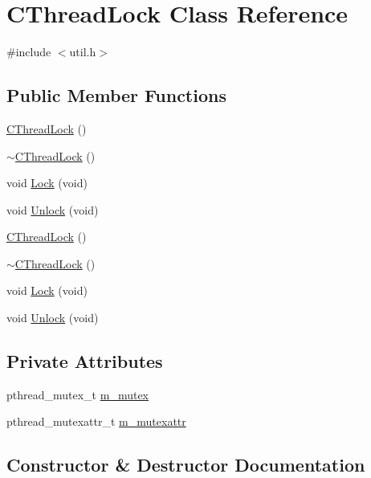 \hypertarget{class_c_thread_lock}{}\section{C\+Thread\+Lock Class Reference}
\label{class_c_thread_lock}


{\ttfamily \#include $<$util.\+h$>$}

\subsection*{Public Member Functions}
\begin{DoxyCompactItemize}
\item 
\hyperlink{class_c_thread_lock_ad9a10f069e555ac5558a223e02c974c0}{C\+Thread\+Lock} ()
\item 
\hyperlink{class_c_thread_lock_aabe3d00aa041fc266dfc766a6294291c}{$\sim$\+C\+Thread\+Lock} ()
\item 
void \hyperlink{class_c_thread_lock_a920e0cd78f82908330f4d0172ff0f38f}{Lock} (void)
\item 
void \hyperlink{class_c_thread_lock_a648f1cb448ff8b4470c61355ccd30241}{Unlock} (void)
\item 
\hyperlink{class_c_thread_lock_ad9a10f069e555ac5558a223e02c974c0}{C\+Thread\+Lock} ()
\item 
\hyperlink{class_c_thread_lock_aabe3d00aa041fc266dfc766a6294291c}{$\sim$\+C\+Thread\+Lock} ()
\item 
void \hyperlink{class_c_thread_lock_a920e0cd78f82908330f4d0172ff0f38f}{Lock} (void)
\item 
void \hyperlink{class_c_thread_lock_a648f1cb448ff8b4470c61355ccd30241}{Unlock} (void)
\end{DoxyCompactItemize}
\subsection*{Private Attributes}
\begin{DoxyCompactItemize}
\item 
pthread\+\_\+mutex\+\_\+t \hyperlink{class_c_thread_lock_a1232fdc54be5b4863269354a7f23225d}{m\+\_\+mutex}
\item 
pthread\+\_\+mutexattr\+\_\+t \hyperlink{class_c_thread_lock_acea8910c9a7484b088fbe22c33ed4ec1}{m\+\_\+mutexattr}
\end{DoxyCompactItemize}


\subsection{Constructor \& Destructor Documentation}
\hypertarget{class_c_thread_lock_ad9a10f069e555ac5558a223e02c974c0}{}
